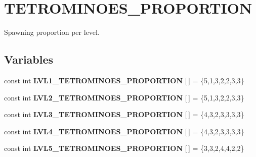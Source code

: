 \hypertarget{group__proportionsGroup}{}\section{T\+E\+T\+R\+O\+M\+I\+N\+O\+E\+S\+\_\+\+P\+R\+O\+P\+O\+R\+T\+I\+ON}
\label{group__proportionsGroup}


Spawning proportion per level.  


\subsection*{Variables}
\begin{DoxyCompactItemize}
\item 
\mbox{\label{group__proportionsGroup_gad2954f5bac8e868a0dcf43509b5b7045}} 
const int {\bfseries L\+V\+L1\+\_\+\+T\+E\+T\+R\+O\+M\+I\+N\+O\+E\+S\+\_\+\+P\+R\+O\+P\+O\+R\+T\+I\+ON} \mbox{[}$\,$\mbox{]} = \{5,1,3,2,2,3,3\}
\item 
\mbox{\label{group__proportionsGroup_ga3c3ecf90dffda0d26855c40ac328be20}} 
const int {\bfseries L\+V\+L2\+\_\+\+T\+E\+T\+R\+O\+M\+I\+N\+O\+E\+S\+\_\+\+P\+R\+O\+P\+O\+R\+T\+I\+ON} \mbox{[}$\,$\mbox{]} = \{5,1,3,2,2,3,3\}
\item 
\mbox{\label{group__proportionsGroup_gae540d0e1e6be7d4b85da39cae3c91e91}} 
const int {\bfseries L\+V\+L3\+\_\+\+T\+E\+T\+R\+O\+M\+I\+N\+O\+E\+S\+\_\+\+P\+R\+O\+P\+O\+R\+T\+I\+ON} \mbox{[}$\,$\mbox{]} = \{4,3,2,3,3,3,3\}
\item 
\mbox{\label{group__proportionsGroup_gad1178e2a9950cd9e35035878a4975e7f}} 
const int {\bfseries L\+V\+L4\+\_\+\+T\+E\+T\+R\+O\+M\+I\+N\+O\+E\+S\+\_\+\+P\+R\+O\+P\+O\+R\+T\+I\+ON} \mbox{[}$\,$\mbox{]} = \{4,3,2,3,3,3,3\}
\item 
\mbox{\label{group__proportionsGroup_gab4acc5185c14239db5315db0f3341e9b}} 
const int {\bfseries L\+V\+L5\+\_\+\+T\+E\+T\+R\+O\+M\+I\+N\+O\+E\+S\+\_\+\+P\+R\+O\+P\+O\+R\+T\+I\+ON} \mbox{[}$\,$\mbox{]} = \{3,3,2,4,4,2,2\}
\item 
\mbox{\label{group__proportionsGroup_ga1f803d5d00b5d63f956db64759379369}} 

\end{DoxyCompactItemize}
